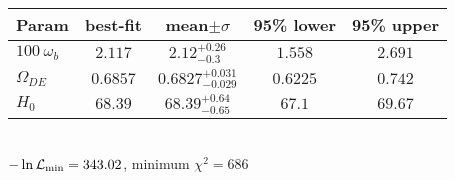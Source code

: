 \begin{tabular}{|l|c|c|c|c|} 
 \hline 
Param & best-fit & mean$\pm\sigma$ & 95\% lower & 95\% upper \\ \hline 
$100~\omega_{b }$ &$2.117$ & $2.12_{-0.3}^{+0.26}$ & $1.558$ & $2.691$ \\ 
$\Omega_{DE}$ &$0.6857$ & $0.6827_{-0.029}^{+0.031}$ & $0.6225$ & $0.742$ \\ 
$H_{0 }$ &$68.39$ & $68.39_{-0.65}^{+0.64}$ & $67.1$ & $69.67$ \\ 
\hline 
 \end{tabular} \\ 
$-\ln{\cal L}_\mathrm{min} =343.02$, minimum $\chi^2=686$ \\ 
